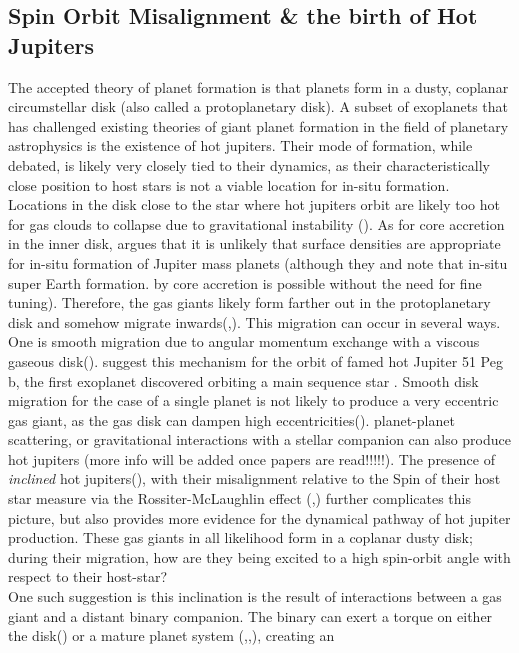 \documentclass[manuscript]{aastex631}
\begin{document}
\subsection{Spin Orbit Misalignment \& the birth of Hot Jupiters}
The accepted theory of planet formation is that planets form in a dusty, coplanar circumstellar disk (also called a protoplanetary
disk). A subset of exoplanets that has challenged existing theories of giant planet formation in the field of planetary astrophysics is the 
existence of hot jupiters. Their mode of formation, while debated, is likely very closely tied to their dynamics, 
as their characteristically close position to host stars is not a viable location for in-situ formation. Locations in the disk close to the star
where hot jupiters orbit are likely too hot for gas clouds to collapse due to gravitational instability (\cite{raf05}). As for core accretion in the inner disk,
\cite{lee16} argues that it is unlikely that surface densities are appropriate for in-situ formation of Jupiter mass planets (although they 
and \cite{chi13} note that in-situ super Earth formation.
by core accretion is possible without the need for fine tuning). Therefore, 
the gas giants likely form farther out in the protoplanetary disk and somehow migrate inwards(\cite{lee16},).  This migration can occur in several ways. One is 
smooth migration due to angular momentum exchange with a viscous gaseous disk(\cite{gol80}). \cite{lin96} suggest 
this mechanism for the orbit of famed hot Jupiter 51 Peg b, the first exoplanet discovered orbiting 
a main sequence star \cite{may95}. Smooth disk migration for the case of a single planet is not likely to produce a very eccentric gas giant, as the gas 
disk can dampen high eccentricities(\cite{duf15}).
planet-planet scattering, or gravitational interactions with a stellar companion can also produce hot jupiters (more info will be added once papers are read!!!!!).
The presence of \textit{inclined} hot jupiters(\cite{alb12}), with their misalignment relative to the Spin
of their host star measure via the Rossiter-McLaughlin effect (\cite{ros24},) further complicates this picture, but also provides more evidence for the dynamical pathway of hot jupiter production. 
These gas giants in all likelihood form in a coplanar dusty disk; during their migration, how are they being excited 
to a high spin-orbit angle with respect to their host-star?\\ 
One such suggestion is this inclination is the result of interactions between a gas giant and a distant binary companion. 
The binary can exert a torque on either the disk(\cite{bat12}) or a mature planet system (\cite{fab07},\cite{kai11},\cite{dro20}), creating an 
\end{document}
